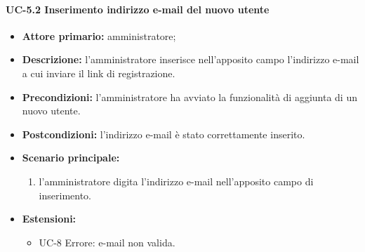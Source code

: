     \paragraph{UC-5.2 Inserimento indirizzo e-mail del nuovo utente}
    \begin{itemize}
        \item \textbf{Attore primario:} amministratore; 
    
        \item \textbf{Descrizione:} l'amministratore inserisce nell'apposito campo l'indirizzo e-mail a cui inviare il link di registrazione.
    
        \item \textbf{Precondizioni:} l'amministratore ha avviato la funzionalità di aggiunta di un nuovo utente.
    
        \item \textbf{Postcondizioni:} l'indirizzo e-mail è stato correttamente inserito.
    
        \item \textbf{Scenario principale:}
              \begin{enumerate}
                  \item l'amministratore digita l'indirizzo e-mail nell'apposito campo di inserimento.
              \end{enumerate}
        \item \textbf{Estensioni:}
              \begin{itemize}
                    \item UC-8 Errore: e-mail non valida.
            \end{itemize}
    \end{itemize}


